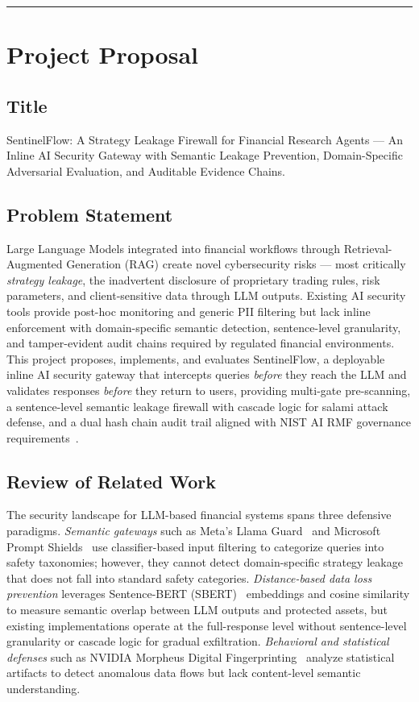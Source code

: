 \documentclass[journal,12pt,onecolumn,draftclsnofoot]{IEEEtran}
\begin{document}
\noindent\rule{8cm}{0.5pt}


\section{Project Proposal}
\subsection{Title}
SentinelFlow: A Strategy Leakage Firewall for Financial Research Agents --- An Inline AI Security Gateway with Semantic Leakage Prevention, Domain-Specific Adversarial Evaluation, and Auditable Evidence Chains.

\subsection{Problem Statement}
Large Language Models integrated into financial workflows through Retrieval-Augmented Generation (RAG) create novel cybersecurity risks --- most critically \textit{strategy leakage}, the inadvertent disclosure of proprietary trading rules, risk parameters, and client-sensitive data through LLM outputs. Existing AI security tools provide post-hoc monitoring and generic PII filtering but lack inline enforcement with domain-specific semantic detection, sentence-level granularity, and tamper-evident audit chains required by regulated financial environments. This project proposes, implements, and evaluates SentinelFlow, a deployable inline AI security gateway that intercepts queries \textit{before} they reach the LLM and validates responses \textit{before} they return to users, providing multi-gate pre-scanning, a sentence-level semantic leakage firewall with cascade logic for salami attack defense, and a dual hash chain audit trail aligned with NIST AI RMF governance requirements~\cite{owasp_llm_2025, nist_ai_rmf}.

\subsection{Review of Related Work}
The security landscape for LLM-based financial systems spans three defensive paradigms. \textit{Semantic gateways} such as Meta's Llama Guard~\cite{llama_guard} and Microsoft Prompt Shields~\cite{ms_prompt_shields} use classifier-based input filtering to categorize queries into safety taxonomies; however, they cannot detect domain-specific strategy leakage that does not fall into standard safety categories. \textit{Distance-based data loss prevention} leverages Sentence-BERT (SBERT)~\cite{sbert} embeddings and cosine similarity to measure semantic overlap between LLM outputs and protected assets, but existing implementations operate at the full-response level without sentence-level granularity or cascade logic for gradual exfiltration. \textit{Behavioral and statistical defenses} such as NVIDIA Morpheus Digital Fingerprinting~\cite{nvidia_morpheus} analyze statistical artifacts to detect anomalous data flows but lack content-level semantic understanding.
\end{document}
